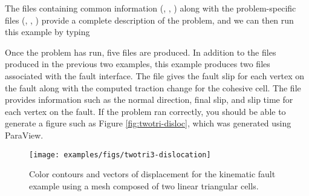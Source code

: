 The files containing common information (,
, ) along with
the problem-specific files (,
,
) provide a complete
description of the problem, and we can then run this example by typing
Once the problem has run, five files are produced. In addition to the
files produced in the previous two examples, this example produces two
files associated with the fault interface. The file
 gives the fault slip for
each vertex on the fault along with the computed traction change for
the cohesive cell. The file 
provides information such as the normal direction, final slip, and
slip time for each vertex on the fault. If the problem ran correctly,
you should be able to generate a figure such as Figure
\vref{fig:twotri-disloc}, which was generated using ParaView.

\begin{figure}
  \texttt{[image: examples/figs/twotri3-dislocation]}
  \caption{Color contours and vectors of displacement for the kinematic fault
    example using a mesh composed of two linear triangular cells.}
  \label{fig:twotri-disloc}
\end{figure}

